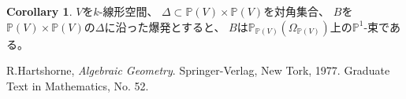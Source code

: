 \documentclass[uplatex]{jsarticle}
\theoremstyle{definition}
\newtheorem{cor}[cor]{Corollary}
\renewcommand{\P}{\mathbb{P}}
\begin{document}
\begin{cor}
  \(V\)を\(k\)-線形空間、
  \(\Delta\subset \P(V)\times \P(V)\)を対角集合、
  \(B\)を\(\P(V)\times \P(V)\)の\(\Delta\)に沿った爆発とすると、
  \(B\)は\(\P_{\P(V)}(\Omega_{\P(V)})\)上の\(\P^1\)-束である。
\end{cor}




\begin{thebibliography}{9}
  R.Hartshorne,
  \textit{Algebraic Geometry}.
  Springer-Verlag, New Tork, 1977. Graduate Text in Mathematics, No. 52.
\end{thebibliography}
\end{document}
